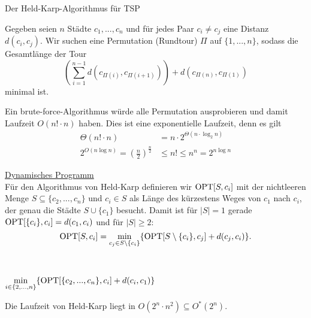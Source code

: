 \begin{section}{Der Held-Karp-Algorithmus für TSP}

  Gegeben seien \(n\) Städte \(c_1, ..., c_n\) und für jedes Paar \(c_i \neq c_j\) eine Distanz \(d(c_i,c_j)\). Wir suchen eine Permutation (Rundtour) \(\Pi\) auf \(\{1,...,n\}\), sodass die Gesamtlänge der Tour 
  \[\left( \sum_{i=1}^{n-1} d(c_{\Pi(i)},c_{\Pi(i+1)}) \right) + d(c_{\Pi(n)},c_{\Pi(1)})\] 
  minimal ist.

  Ein brute-force-Algorithmus würde alle Permutation ausprobieren und damit Laufzeit \(O(n! \cdot n)\) haben. Dies ist eine exponentielle Laufzeit, denn es gilt
  \begin{align*}
    \Theta(n!\cdot n) &= n\cdot 2^{\Theta(n \cdot \log_2 n)}\\
    2^{O(n \log n)} = (\frac{n}{2})^{\frac{n}{2}} &\leq n! \leq n^n = 2^{n\log n}
  \end{align*}
  
  \underline{Dynamisches Programm}\\
  Für den Algorithmus von Held-Karp definieren wir \(\text{OPT}[S,c_i]\) mit der nichtleeren Menge \(S \subseteq \{ c_2, ..., c_n \}\) und \(c_i \in S\) als Länge des kürzestens Weges von \(c_1\) nach \(c_i\), der genau die Städte \(S \cup \{ c_1 \}\) besucht. Damit ist für $|S| = 1$ gerade \(\text{OPT}[\{c_i\},c_i] = d(c_1,c_i)\) und für $|S| \geq 2$:
  \[\text{OPT}[S,c_i] = \min_{c_j \in S \setminus \{c_i\}} \{ \text{OPT}[S \setminus \{ c_i \}, c_j ] + d(c_j,c_i)\}.\]

  \begin{algorithm}[H]
    \caption{Algorithmus von Held-Karp zum Lösen von TSP}

     \\



    \Return \(\displaystyle \min_{i \in \{2,...,n\}} \{ \text{OPT}[\{c_2,...,c_n\},c_i] + d(c_i,c_1) \}\)
  \end{algorithm}

  Die Laufzeit von Held-Karp liegt in \(O(2^n \cdot n^2) \subseteq O^*(2^n)\). 
\end{section}

